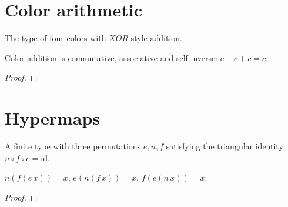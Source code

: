 %
%

\chapter{Color arithmetic}


\begin{definition}
  \label{def:Color}
  \leanok
  The type of four colors with $XOR$-style addition.
\end{definition}

\begin{theorem}
  \label{thm:Color-addc}
  \leanok
  Color addition is commutative, associative and self-inverse: $c + c + c = c$.
\end{theorem}
\begin{proof}\leanok\end{proof}

\chapter{Hypermaps}


\begin{definition}[Hypermap]
  \label{def:Hypermap}
  \leanok
  A finite type with three permutations $e, n, f$ satisfying the triangular
  identity $n \circ f \circ e = \mathrm{id}$.
\end{definition}

\begin{theorem}
  \label{thm:Hypermap-cancel3}
  \leanok
  $n(f(e\,x)) = x$, $e(n(f\,x)) = x$, $f(e(n\,x)) = x$.
\end{theorem}
\begin{proof}\leanok\end{proof}

